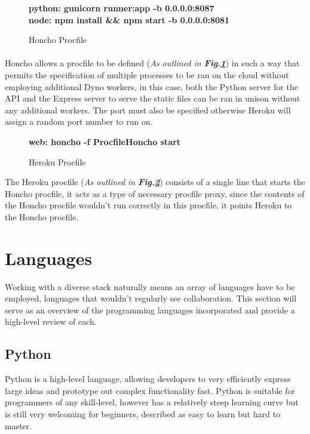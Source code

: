 \begin{figure}[H]
    \centering
    \textbf{python: gunicorn runner:app -b 0.0.0.0:8087\\ node: npm install \&\& npm start -b 0.0.0.0:8081}
    \caption{Honcho Procfile}
    \label{image:honchoProcfile}
\end{figure}

\paragraph{}
Honcho allows a procfile to be defined (\textit{As outlined in \textbf{Fig.\ref{image:honchoProcfile}}}) in such a way that permits the specification of multiple processes to be ran on the cloud without employing additional Dyno workers, in this case, both the Python server for the API and the Express server to serve the static files can be ran in unison without any additional workers. The port must also be specified otherwise Heroku will assign a random port number to run on.

\begin{figure}[H]
    \centering
    \textbf{web: honcho -f ProcfileHoncho start}
    \caption{Heroku Procfile}
    \label{image:herokuProcfile}
\end{figure}

The Heroku procfile (\textit{As outlined in \textbf{Fig.\ref{image:herokuProcfile}}}) consists of a single line that starts the Honcho procfile, it acts as a type of necessary procfile proxy, since the contents of the Honcho procfile wouldn't run correctly in this procfile, it points Heroku to the Honcho procfile.

\begin{center}

\end{center}

\section{Languages}
Working with a diverse stack naturally means an array of languages have to be employed, languages that wouldn't regularly see collaboration. This section will serve as an overview of the programming languages incorporated and provide a high-level review of each.

\subsection{Python}
Python is a high-level language, allowing developers to very efficiently express large ideas and prototype out complex functionality fast. Python is suitable for programmers of any skill-level, however has a relatively steep learning curve but is still very welcoming for beginners, described as easy to learn but hard to master.

